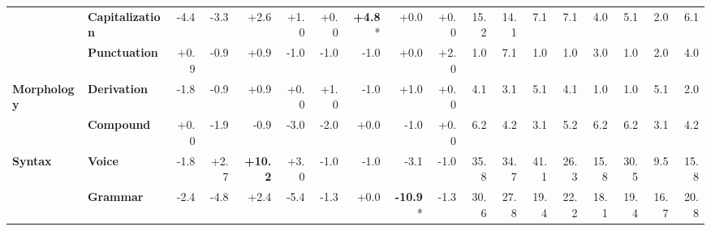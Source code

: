 \begin{table}[h]
{\begin{tabular}{llrrrrrrrrrrrrrrrr}
  & \textbf{Capitalization} & \cellcolor{red!8} -4.4 & \cellcolor{red!6} -3.3 & \cellcolor{green!5} +2.6 & \cellcolor{green!1} +1.0 & \cellcolor{red!0} +0.0 & \cellcolor{green!9} \textbf{+4.8}* & \cellcolor{red!0} +0.0 & \cellcolor{red!0} +0.0 & \cellcolor{blue!3} 15.2 & \cellcolor{blue!2} 14.1 & \cellcolor{blue!1} 7.1 & \cellcolor{blue!1} 7.1 & \cellcolor{blue!0} 4.0 & \cellcolor{blue!1} 5.1 & \cellcolor{blue!0} 2.0 & \cellcolor{blue!1} 6.1 \\
  & \textbf{Punctuation} & \cellcolor{green!1} +0.9 & \cellcolor{red!1} -0.9 & \cellcolor{green!1} +0.9 & \cellcolor{red!1} -1.0 & \cellcolor{red!1} -1.0 & \cellcolor{red!1} -1.0 & \cellcolor{red!0} +0.0 & \cellcolor{green!3} +2.0 & \cellcolor{blue!0} 1.0 & \cellcolor{blue!1} 7.1 & \cellcolor{blue!0} 1.0 & \cellcolor{blue!0} 1.0 & \cellcolor{blue!0} 3.0 & \cellcolor{blue!0} 1.0 & \cellcolor{blue!0} 2.0 & \cellcolor{blue!0} 4.0 \\
\midrule
\textbf{Morphology} & \textbf{Derivation} & \cellcolor{red!3} -1.8 & \cellcolor{red!1} -0.9 & \cellcolor{green!1} +0.9 & \cellcolor{red!0} +0.0 & \cellcolor{green!1} +1.0 & \cellcolor{red!1} -1.0 & \cellcolor{green!1} +1.0 & \cellcolor{red!0} +0.0 & \cellcolor{blue!0} 4.1 & \cellcolor{blue!0} 3.1 & \cellcolor{blue!1} 5.1 & \cellcolor{blue!0} 4.1 & \cellcolor{blue!0} 1.0 & \cellcolor{blue!0} 1.0 & \cellcolor{blue!1} 5.1 & \cellcolor{blue!0} 2.0 \\
  & \textbf{Compound} & \cellcolor{red!0} +0.0 & \cellcolor{red!3} -1.9 & \cellcolor{red!1} -0.9 & \cellcolor{red!6} -3.0 & \cellcolor{red!4} -2.0 & \cellcolor{red!0} +0.0 & \cellcolor{red!2} -1.0 & \cellcolor{red!0} +0.0 & \cellcolor{blue!1} 6.2 & \cellcolor{blue!0} 4.2 & \cellcolor{blue!0} 3.1 & \cellcolor{blue!1} 5.2 & \cellcolor{blue!1} 6.2 & \cellcolor{blue!1} 6.2 & \cellcolor{blue!0} 3.1 & \cellcolor{blue!0} 4.2 \\
\midrule
\textbf{Syntax} & \textbf{Voice} & \cellcolor{red!3} -1.8 & \cellcolor{green!5} +2.7 & \cellcolor{green!20} \textbf{+10.2} & \cellcolor{green!6} +3.0 & \cellcolor{red!2} -1.0 & \cellcolor{red!2} -1.0 & \cellcolor{red!6} -3.1 & \cellcolor{red!2} -1.0 & \cellcolor{blue!7} 35.8 & \cellcolor{blue!6} 34.7 & \cellcolor{blue!8} 41.1 & \cellcolor{blue!5} 26.3 & \cellcolor{blue!3} 15.8 & \cellcolor{blue!6} 30.5 & \cellcolor{blue!1} 9.5 & \cellcolor{blue!3} 15.8 \\
  & \textbf{Grammar} & \cellcolor{red!4} -2.4 & \cellcolor{red!9} -4.8 & \cellcolor{green!4} +2.4 & \cellcolor{red!10} -5.4 & \cellcolor{red!2} -1.3 & \cellcolor{red!0} +0.0 & \cellcolor{red!20} \textbf{-10.9}* & \cellcolor{red!2} -1.3 & \cellcolor{blue!6} 30.6 & \cellcolor{blue!5} 27.8 & \cellcolor{blue!3} 19.4 & \cellcolor{blue!4} 22.2 & \cellcolor{blue!3} 18.1 & \cellcolor{blue!3} 19.4 & \cellcolor{blue!3} 16.7 & \cellcolor{blue!4} 20.8 \\

\end{tabular}}
\end{table}

